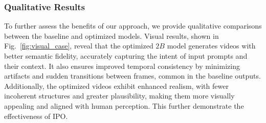 \subsubsection{Qualitative Results}
To further assess the benefits of our approach, we provide qualitative comparisons between the baseline and optimized models. Visual results, shown in Fig.~\ref{fig:visual_case}, reveal that the optimized $2B$ model generates videos with better semantic fidelity, accurately capturing the intent of input prompts and their context. It also ensures improved temporal consistency by minimizing artifacts and sudden transitions between frames, common in the baseline outputs. Additionally, the optimized videos exhibit enhanced realism, with fewer incoherent structures and greater plausibility, making them more visually appealing and aligned with human perception. This further demonstrate the effectiveness of IPO.




